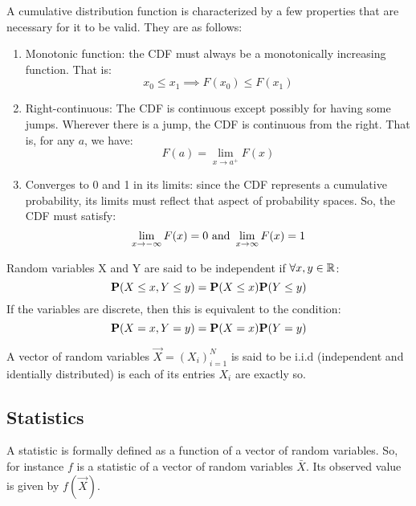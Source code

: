 \begin{theorem}
A cumulative distribution function is characterized by a few properties that are necessary for it to be valid. They are as follows:
  \begin{enumerate}
    \item Monotonic function: the CDF must always be a monotonically increasing function. That is:
      $$ x_0 \leq x_1 \implies F(x_0) \leq F(x_1) $$
    \item Right-continuous: The CDF is continuous except possibly for having some jumps. Wherever there is a jump, the CDF is continuous from the right. That is, for any $a$, we have:
    $$ F(a) = \lim_{x \to a^+} F(x) $$
    \item Converges to 0 and 1 in its limits: since the CDF represents a cumulative probability, its limits must reflect that aspect of probability spaces. So, the CDF must satisfy:
    $$ \lim_{x \to -\infty} F(x) = 0 \and \lim_{x \to \infty} F(x) = 1 $$
  \end{enumerate}
\end{theorem}


\begin{definition}[Independence]
Random variables X and Y are said to be independent if $\forall x,y \in \R$:
$$ \P(X \leq x, Y \leq y) = \P(X \leq x) \P(Y \leq y)$$
If the variables are discrete, then this is equivalent to the condition:
$$ \P(X = x, Y = y) = \P(X = x) \P(Y = y) $$
\end{definition}

\begin{definition}[i.i.d]
A vector of random variables $\vec{X} = (X_i)_{i = 1}^N$ is said to be i.i.d (independent and identially distributed) is each of its entries $X_i$ are exactly so.
\end{definition}

\subsection{Statistics}

\begin{definition}[Statistic]
A statistic is formally defined as a function of a vector of random variables. So, for instance $f$ is a statistic of a vector of random variables $\bar{X}$. Its observed value is given by $f(\vec{X})$.
\end{definition}

